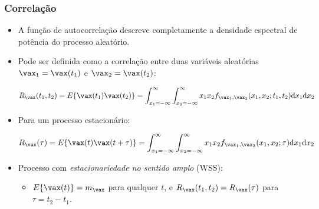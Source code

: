 \begin{frame}
    \frametitle{Correlação}

    \begin{itemize}
     \item A função de autocorrelação descreve completamente a densidade espectral de potência do processo aleatório.
      \item Pode ser definida como a correlação entre duas variáveis aleatórias $\vax_1 = \vax(t_1)$ e $\vax_2 = \vax(t_2)$:
      \begin{small}
      \begin{align*}
	  R_{\vax}(t_1,t_2) = E\{\vax(t_1)\vax(t_2)\} = \int_{x_1=-\infty}^{\infty}\int_{x_2=-\infty}^{\infty} x_1 x_2 f_{\vax_1,\vax_2}(x_1,x_2;t_1,t_2)\mathrm{d}x_1\mathrm{d}x_2
      \end{align*}\end{small}
      \item Para um processo estacionário:
      \begin{small}
      \begin{align*}
	  R_{\vax}(\tau) = E\{\vax(t)\vax(t+\tau)\} = \int_{x_1=-\infty}^{\infty}\int_{x_2=-\infty}^{\infty} x_1 x_2 f_{\vax_1,\vax_2}(x_1,x_2;\tau)\mathrm{d}x_1\mathrm{d}x_2
      \end{align*}\end{small}
      \item Processo com \textit{estacionariedade no sentido amplo} (WSS): 
      \begin{itemize}
       \item $E\{\vax(t)\} = m_{\vax}$ para qualquer $t$, e $R_{\vax}(t_1,t_2) = R_{\vax}(\tau)$ para $\tau = t_2 - t_1$.
      \end{itemize}

    \end{itemize}
     
\end{frame}

